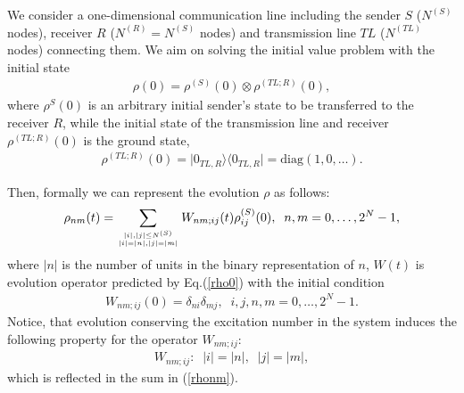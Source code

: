 \documentclass[pra,preprint,showpacs]{revtex4-1}
\begin{document}
We consider a one-dimensional communication line including the sender $S$ {($N^{(S)}$ nodes)}, receiver $R$ {($N^{(R)}=N^{(S)}$ nodes)} and transmission line $TL$  {($N^{(TL)}$ nodes)} connecting them.
We aim on solving the initial value problem with the
initial state
\begin{eqnarray}\label{rho0}
\rho(0)=\rho^{(S)}(0)\otimes \rho^{(TL;R)}(0),
\end{eqnarray}
where $\rho^S(0)$ is an arbitrary  initial sender's state to be transferred to the receiver $R$, while the initial state of the transmission line and receiver $\rho^{(TL;R)}(0)$ is the ground state,
\begin{eqnarray}
\rho^{(TL;R)}(0) = |0_{TL,R}\rangle
{\langle 0_{TL,R}|} = {\mbox{diag}}(1,0,\dots).
\end{eqnarray}

Then, formally we can represent the evolution $\rho$ as follows:
\begin{eqnarray}\label{rhonm}
\rho_{nm}(t)=\sum_{{|i|,|j|\le N^{(S)}}\atop{|i|=|n|, |j|=|m|} } W_{nm;ij}(t)\rho_{ij}^{(S)}(0) ,\;\;n,m=0,\dots,2^N-1,
\end{eqnarray}
where $|n|$ is the number of units in the binary representation of $n$,
 $W(t)$ is  evolution operator predicted by Eq.(\ref{rho0})
with the initial condition
\begin{eqnarray}\label{ic}
W_{nm;ij}(0) =
 \delta_{ni}\delta_{mj},\;\;i,j,n,m=0,\dots,2^{N}-1.
\end{eqnarray}
Notice, that evolution conserving the excitation number in the system induces the following property for the operator $W_{nm;ij}$:
\begin{eqnarray}
W_{nm;ij}: \;\;|i|=|n|,\;\;|j| = |m|,
\end{eqnarray}
which is reflected in the sum in  (\ref{rhonm}).
\end{document}
